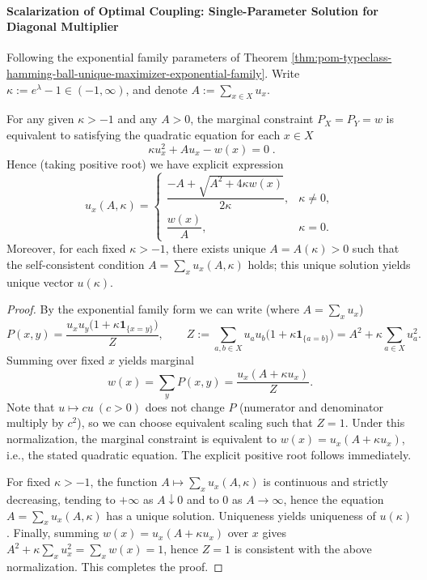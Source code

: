 \paragraph{Scalarization of Optimal Coupling: Single-Parameter Solution for Diagonal Multiplier}
Following the exponential family parameters of Theorem \ref{thm:pom-typeclass-hamming-ball-unique-maximizer-exponential-family}.
Write \(\kappa:=e^{\lambda}-1\in(-1,\infty)\), and denote \(A:=\sum_{x\in X}u_x\).

\begin{theorem}\label{thm:pom-typeclass-diagonal-coupling-scalarization}
For any given \(\kappa>-1\) and any \(A>0\), the marginal constraint \(P_X=P_Y=w\) is equivalent to satisfying the quadratic equation for each \(x\in X\)
\[
\boxed{\;
\kappa u_x^2+A u_x-w(x)=0\; } .
\]
Hence (taking positive root) we have explicit expression
\[
u_x(A,\kappa)=
\begin{cases}
\dfrac{-A+\sqrt{A^2+4\kappa w(x)}}{2\kappa}, & \kappa\ne0,\\[10pt]
\dfrac{w(x)}{A}, & \kappa=0.
\end{cases}
\]
Moreover, for each fixed \(\kappa>-1\), there exists unique \(A=A(\kappa)>0\) such that the self-consistent condition \(A=\sum_x u_x(A,\kappa)\) holds;
this unique solution yields unique vector \(u(\kappa)\).
\end{theorem}
\begin{proof}
By the exponential family form we can write (where \(A=\sum_x u_x\))
\[
P(x,y)=\frac{u_xu_y\bigl(1+\kappa\mathbf 1_{\{x=y\}}\bigr)}{Z},
\qquad
Z:=\sum_{a,b\in X}u_au_b\bigl(1+\kappa\mathbf 1_{\{a=b\}}\bigr)=A^2+\kappa\sum_{a\in X}u_a^2.
\]
Summing over fixed \(x\) yields marginal
\[
w(x)=\sum_y P(x,y)=\frac{u_x(A+\kappa u_x)}{Z}.
\]
Note that \(u\mapsto cu\ (c>0)\) does not change \(P\) (numerator and denominator multiply by \(c^2\)), so we can choose equivalent scaling such that \(Z=1\).
Under this normalization, the marginal constraint is equivalent to \(w(x)=u_x(A+\kappa u_x)\), i.e., the stated quadratic equation.
The explicit positive root follows immediately.
\par
For fixed \(\kappa>-1\), the function \(A\mapsto \sum_x u_x(A,\kappa)\) is continuous and strictly decreasing, tending to \(+\infty\) as \(A\downarrow 0\) and to \(0\) as \(A\to\infty\),
hence the equation \(A=\sum_x u_x(A,\kappa)\) has a unique solution.
Uniqueness yields uniqueness of \(u(\kappa)\).
Finally, summing \(w(x)=u_x(A+\kappa u_x)\) over \(x\) gives \(A^2+\kappa\sum_x u_x^2=\sum_x w(x)=1\), hence \(Z=1\) is consistent with the above normalization. This completes the proof.
\end{proof}

